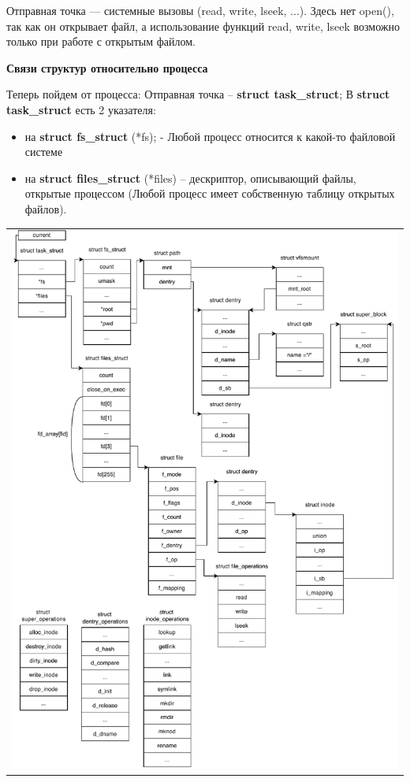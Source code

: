 Отправная точка — системные вызовы (read, write, lseek, ...). Здесь нет open(), так как он открывает файл, а использование функций read, write, lseek возможно только при работе с открытым файлом.

\textbf{Связи структур относительно процесса}
\par Теперь пойдем от процесса: Отправная точка -- \textbf{struct task\_struct};
В \textbf{struct task\_struct} есть 2 указателя: 
\begin{itemize}
\item на \textbf{struct fs\_struct} (*fs); - Любой процесс относится к какой-то файловой системе
\item на \textbf{struct files\_struct} (*files) -- дескриптор, описывающий файлы, открытые процессом (Любой процесс имеет собственную таблицу открытых файлов).
\end{itemize}

\begin{table}[H]
  \centering
  \begin{tabular}{p{1\linewidth}}
    \centering
    \includegraphics[width=0.8\linewidth]{./images/struct_connect_proc.pdf}
  \end{tabular}
\end{table}


